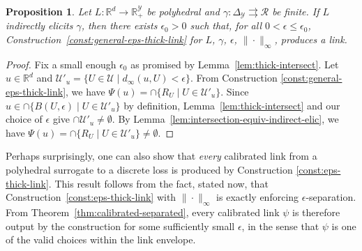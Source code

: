 \documentclass[11pt]{article}
\newcommand{\reals}{\mathbb{R}}
\newcommand{\simplex}{\Delta_\Y}
\newcommand{\R}{\mathcal{R}}
\newcommand{\U}{\mathcal{U}}
\newcommand{\Y}{\mathcal{Y}}
\newcommand{\toto}{\rightrightarrows}
\newtheorem{proposition}{Proposition}
\begin{document}
\begin{proposition}\label{prop:general-eps-thick-produce}
  Let $L:\reals^d\to\reals^\Y_+$ be polyhedral and $\gamma:\simplex\toto\R$ be finite.
  If $L$ indirectly elicits $\gamma$, then there exists $\epsilon_0 > 0$ such that, for all $0 < \epsilon \leq \epsilon_0$, Construction~\ref{const:general-eps-thick-link} for $L$, $\gamma$, $\epsilon$, $\|\cdot\|_\infty$, produces a link.
\end{proposition}
\begin{proof}
  Fix a small enough $\epsilon_0$ as promised by Lemma~\ref{lem:thick-intersect}.
  Let $u\in\reals^d$ and $\U'_u = \{U\in\U \mid d_\infty(u,U) < \epsilon\}$.
  From Construction \ref{const:general-eps-thick-link}, we have $\Psi(u) = \cap \{R_U \mid U\in\U'_u\}$.
  Since $u\in\cap\{B(U,\epsilon) \mid U\in\U'_u\} $ by definition, Lemma~\ref{lem:thick-intersect} and our choice of $\epsilon$ give $\cap\U'_u \neq \emptyset$.
  By Lemma~\ref{lem:intersection-equiv-indirect-elic}, we have $\Psi(u) = \cap \{R_U \mid U\in\U'_u\} \neq \emptyset$.
\end{proof}


Perhaps surprisingly, one can also show that \emph{every} calibrated link from a polyhedral surrogate to a discrete loss is produced by Construction \ref{const:eps-thick-link}.
This result follows from the fact, stated now, that Construction~\ref{const:eps-thick-link} with $\|\cdot\|_\infty$ is exactly enforcing $\epsilon$-separation.
From Theorem~\ref{thm:calibrated-separated}, every calibrated link $\psi$ is therefore output by the construction for some sufficiently small $\epsilon$, in the sense that $\psi$ is one of the valid choices within the link envelope.
\end{document}
